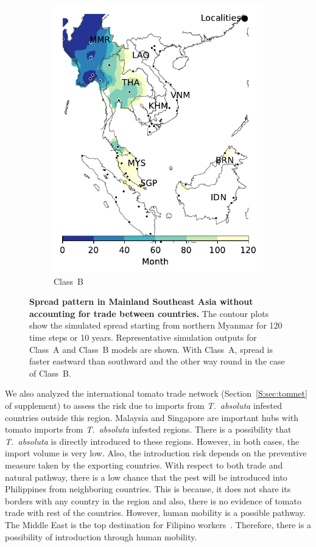\documentclass[11pt]{article}
\newcommand{\tuta}{\emph{T.~absoluta}}
\theoremstyle{definition}
\begin{document}
\begin{figure}[ht]
\begin{subfigure}[b]{.47\textwidth}
    \includegraphics[width=\textwidth]{../cellular_automata/results/contour/MSA_model-B_m1_l3.pdf}
    \caption{Class~B\label{fig:msaClassB}}
\end{subfigure}
\caption{\textbf{Spread pattern in Mainland Southeast Asia without
accounting for trade between countries.} The contour plots show the
simulated spread starting from northern Myanmar for 120 time steps or 10
years. Representative simulation outputs for Class~A and Class~B models are
shown. With {Class~A}, spread is faster eastward than southward and the
other way round in the case of Class~B.\label{fig:msaClassAB} }
\end{figure}

We also analyzed the international tomato
trade network (Section~\ref{S:sec:tomnet} of supplement) to assess the risk
due to imports from \tuta{} infested countries outside this region.
Malaysia and Singapore are important hubs with
tomato imports from \tuta{} infested regions. There is a possibility that
\tuta{} is directly introduced to these regions.  However, in both cases,
the import volume is very low. Also, the introduction risk depends on the
preventive measure taken by the exporting countries. With respect to both
trade and natural pathway, there is a low chance that the pest will be
introduced into Philippines from neighboring countries.  This is because,
it does not share its borders with any country in the region and also,
there is no evidence of tomato trade with rest of the countries. However,
human mobility is a possible pathway. The Middle East is the top
destination for Filipino workers~\cite{rodriguez2011philippine}.
Therefore, there is a possibility of introduction through human mobility.
\end{document}
